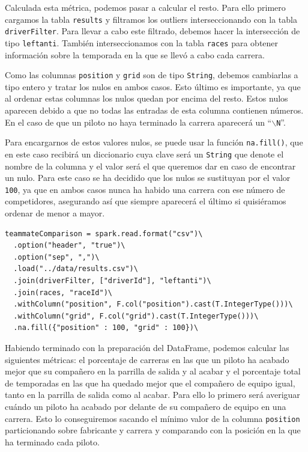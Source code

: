 \documentclass[12pt,twoside,titlepage]{report}
\newcommand{\quotes}[1]{``#1''}
\begin{document}
Calculada esta métrica, podemos pasar a calcular el resto. Para ello primero cargamos la tabla \texttt{results} y filtramos los outliers interseccionando con la tabla \texttt{driverFilter}. Para llevar a cabo este filtrado, debemos hacer la intersección de tipo \texttt{leftanti}. También interseccionamos con la tabla \texttt{races} para obtener información sobre la temporada en la que se llevó a cabo cada carrera.

Como las columnas \texttt{position} y \texttt{grid} son de tipo \texttt{String}, debemos cambiarlas a tipo entero y tratar los nulos en ambos casos. Esto último es importante, ya que al ordenar estas columnas los nulos quedan por encima del resto. Estos nulos aparecen debido a que no todas las entradas de esta columna contienen números. En el caso de que un piloto no haya terminado la carrera aparecerá un \quotes{\texttt{$\backslash$N}}.

Para encargarnos de estos valores nulos, se puede usar la función \texttt{na.fill()}, que en este caso recibirá un diccionario cuya clave será un \texttt{String} que denote el nombre de la columna y el valor será el que queremos dar en caso de encontrar un nulo. Para este caso se ha decidido que los nulos se sustituyan por el valor \texttt{100}, ya que en ambos casos nunca ha habido una carrera con ese número de competidores, asegurando así que siempre aparecerá el último si quisiéramos ordenar de menor a mayor.

\begin{lstlisting}
teammateComparison = spark.read.format("csv")\
  .option("header", "true")\
  .option("sep", ",")\
  .load("../data/results.csv")\
  .join(driverFilter, ["driverId"], "leftanti")\
  .join(races, "raceId")\
  .withColumn("position", F.col("position").cast(T.IntegerType()))\
  .withColumn("grid", F.col("grid").cast(T.IntegerType()))\
  .na.fill({"position" : 100, "grid" : 100})\
\end{lstlisting}

Habiendo terminado con la preparación del DataFrame, podemos calcular las siguientes métricas: el porcentaje de carreras en las que un piloto ha acabado mejor que su compañero en la parrilla de salida y al acabar y el porcentaje total de temporadas en las que ha quedado mejor que el compañero de equipo igual, tanto en la parrilla de salida como al acabar. Para ello lo primero será averiguar cuándo un piloto ha acabado por delante de su compañero de equipo en una carrera. Esto lo conseguiremos sacando el mínimo valor de la columna \texttt{position} particionando sobre fabricante y carrera y comparando con la posición en la que ha terminado cada piloto.
\end{document}
